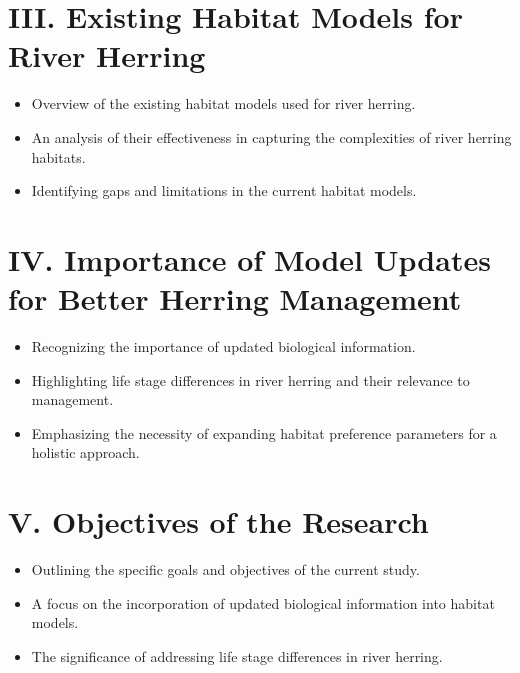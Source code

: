 \documentclass[
]{book}
\providecommand{\tightlist}{%
  \setlength{\itemsep}{0pt}\setlength{\parskip}{0pt}}
\begin{document}
\hypertarget{iii.-existing-habitat-models-for-river-herring}{%
\section{III. Existing Habitat Models for River Herring}\label{iii.-existing-habitat-models-for-river-herring}}

\begin{itemize}
\tightlist
\item
  Overview of the existing habitat models used for river herring.
\item
  An analysis of their effectiveness in capturing the complexities of river herring habitats.
\item
  Identifying gaps and limitations in the current habitat models.
\end{itemize}

\hypertarget{iv.-importance-of-model-updates-for-better-herring-management}{%
\section{IV. Importance of Model Updates for Better Herring Management}\label{iv.-importance-of-model-updates-for-better-herring-management}}

\begin{itemize}
\tightlist
\item
  Recognizing the importance of updated biological information.
\item
  Highlighting life stage differences in river herring and their relevance to management.
\item
  Emphasizing the necessity of expanding habitat preference parameters for a holistic approach.
\end{itemize}

\hypertarget{v.-objectives-of-the-research}{%
\section{V. Objectives of the Research}\label{v.-objectives-of-the-research}}

\begin{itemize}
\tightlist
\item
  Outlining the specific goals and objectives of the current study.
\item
  A focus on the incorporation of updated biological information into habitat models.
\item
  The significance of addressing life stage differences in river herring.
\end{itemize}
\end{document}
